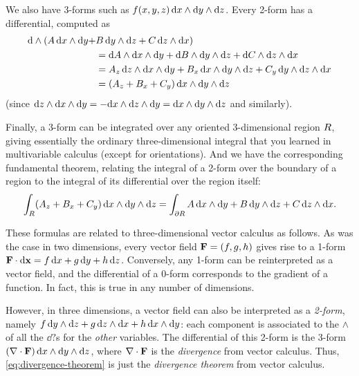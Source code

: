 \documentclass[12pt]{amsart}
\begin{document}
We also have 3-forms such as $f(x,y,z)\, \dx\wedge\dy\wedge\dz$.
Every 2-form has a differential, computed as
\begin{align*}
  \extd(A\,\dx\wedge\dy + & B\,\dy\wedge\dz + C \,\dz\wedge\dx)\\
  &= \dd A \wedge \dx \wedge \dy + \dd B \wedge \dy \wedge \dz + \dd C \wedge \dz \wedge \dx\\
  &= \pder A z\, \dz \wedge \dx \wedge \dy + \pder B x \,\dx \wedge \dy \wedge \dz + \pder C y \,\dy\wedge \dz \wedge \dx\\
  &= (\pder A z + \pder B x + \pder C y)\, \dx\wedge\dy\wedge \dz
\end{align*}
(since $\dz \wedge \dx \wedge \dy = -\dx \wedge \dz \wedge \dy = \dx \wedge \dy \wedge \dz$ and similarly).

Finally, a 3-form can be integrated over any oriented 3-dimensional region $\region$, giving essentially the ordinary three-dimensional integral that you learned in multivariable calculus (except for orientations).
And we have the corresponding fundamental theorem, relating the integral of a 2-form over the boundary of a region to the integral of its differential over the region itself:
\begin{equation}
  \int_{\region} (\pder A z + \pder B x + \pder C y)\, \dx\wedge\dy\wedge \dz = \int_{\bdry\region} A\,\dx\wedge\dy + B\,\dy\wedge\dz + C \,\dz\wedge\dx.\label{eq:divergence-theorem}
\end{equation}

These formulas are related to three-dimensional vector calculus as follows.
As was the case in two dimensions, every vector field $\vc{F}=\vcc{f,g,h}$ gives rise to a 1-form $\dotp{\vc{F}}{\dpx} = f\,\dx + g\,\dy + h\,\dz$.
Conversely, any 1-form can be reinterpreted as a vector field, and the differential of a 0-form corresponds to the gradient of a function.
In fact, this is true in any number of dimensions.

However, in three dimensions, a vector field can also be interpreted as a \emph{2-form}, namely $f\,\dy\wedge\dz + g \,\dz\wedge\dx + h \,\dx\wedge\dy$: each component is associated to the $\wedge$ of all the $\dd?$s for the \emph{other} variables.
The differential of this 2-form is the 3-form $(\div{\vc{F}})\,\dx\wedge\dy\wedge\dz$, where $\div{\vc{F}}$ is the \emph{divergence} from vector calculus.
Thus, \cref{eq:divergence-theorem} is just the \emph{divergence theorem} from vector calculus.
\end{document}
